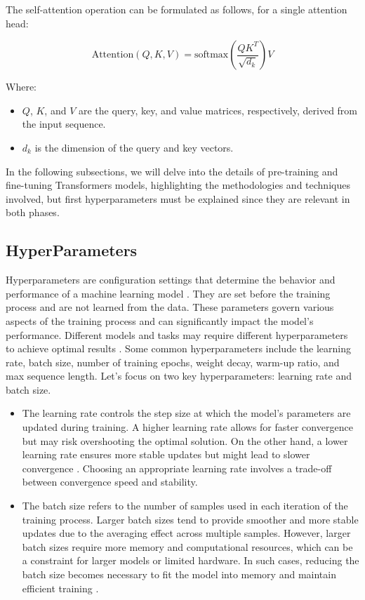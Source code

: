 The self-attention operation can be formulated as follows, for a single attention head:

\[
\text{Attention}(Q, K, V) = \text{softmax}\left(\frac{QK^T}{\sqrt{d_k}}\right)V
\]

Where:
\begin{itemize}
    \item \(Q\), \(K\), and \(V\) are the query, key, and value matrices, respectively, derived from the input sequence.
    \item \(d_k\) is the dimension of the query and key vectors.
\end{itemize}
\vspace{0.5cm}

In the following subsections, we will delve into the details of pre-training and fine-tuning Transformers models, highlighting the methodologies and techniques involved, but first hyperparameters must be explained since they are relevant in both phases.

\subsection{HyperParameters}
Hyperparameters are configuration settings that determine the behavior and performance of a machine learning model \parencite{Goodfellow-et-al-2016}. They are set before the training process and are not learned from the data. These parameters govern various aspects of the training process and can significantly impact the model's performance. Different models and tasks may require different hyperparameters to achieve optimal results \parencite{bergstra2012random}. Some common hyperparameters include the learning rate, batch size, number of training epochs, weight decay, warm-up ratio, and max sequence length. Let's focus on two key hyperparameters: learning rate and batch size.

\begin{itemize}[]
\item The learning rate controls the step size at which the model's parameters are updated during training. A higher learning rate allows for faster convergence but may risk overshooting the optimal solution. On the other hand, a lower learning rate ensures more stable updates but might lead to slower convergence \parencite{series/lncs/Bottou12}. Choosing an appropriate learning rate involves a trade-off between convergence speed and stability.
\item The batch size refers to the number of samples used in each iteration of the training process. Larger batch sizes tend to provide smoother and more stable updates due to the averaging effect across multiple samples. However, larger batch sizes require more memory and computational resources, which can be a constraint for larger models or limited hardware. In such cases, reducing the batch size becomes necessary to fit the model into memory and maintain efficient training \parencite{keskar2017largebatch}.
\end{itemize}

